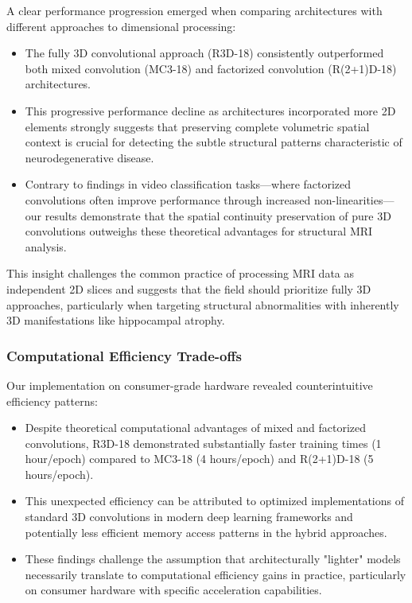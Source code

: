 \documentclass[12pt, a4paper]{article}
\begin{document}
A clear performance progression emerged when comparing architectures with different approaches to dimensional processing:

\begin{itemize}
    \item The fully 3D convolutional approach (R3D-18) consistently outperformed both mixed convolution (MC3-18) and factorized convolution (R(2+1)D-18) architectures.
    
    \item This progressive performance decline as architectures incorporated more 2D elements strongly suggests that preserving complete volumetric spatial context is crucial for detecting the subtle structural patterns characteristic of neurodegenerative disease.
    
    \item Contrary to findings in video classification tasks—where factorized convolutions often improve performance through increased non-linearities—our results demonstrate that the spatial continuity preservation of pure 3D convolutions outweighs these theoretical advantages for structural MRI analysis.
\end{itemize}

This insight challenges the common practice of processing MRI data as independent 2D slices and suggests that the field should prioritize fully 3D approaches, particularly when targeting structural abnormalities with inherently 3D manifestations like hippocampal atrophy.

\subsubsection{Computational Efficiency Trade-offs}

Our implementation on consumer-grade hardware revealed counterintuitive efficiency patterns:

\begin{itemize}
    \item Despite theoretical computational advantages of mixed and factorized convolutions, R3D-18 demonstrated substantially faster training times (1 hour/epoch) compared to MC3-18 (4 hours/epoch) and R(2+1)D-18 (5 hours/epoch).
    
    \item This unexpected efficiency can be attributed to optimized implementations of standard 3D convolutions in modern deep learning frameworks and potentially less efficient memory access patterns in the hybrid approaches.
    
    \item These findings challenge the assumption that architecturally "lighter" models necessarily translate to computational efficiency gains in practice, particularly on consumer hardware with specific acceleration capabilities.
\end{itemize}
\end{document}
